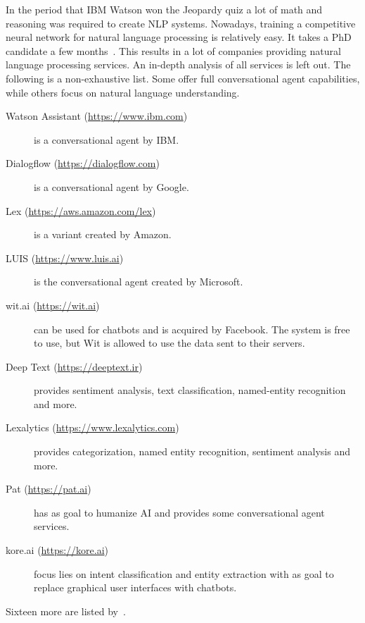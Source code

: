 In the period that IBM Watson won the Jeopardy quiz a lot of math and reasoning was required to create NLP systems.
Nowadays, training a competitive neural network for natural language processing is relatively easy.
It takes a PhD candidate a few months~\citep{manning2017lectures}.
This results in a lot of companies providing natural language processing services.
An in-depth analysis of all services is left out.
The following is a non-exhaustive list.
Some offer full conversational agent capabilities, while others focus on natural language understanding.
\begin{description}
    \item [Watson Assistant (\url{https://www.ibm.com})] is a conversational agent by IBM.
    \item [Dialogflow (\url{https://dialogflow.com})] is a conversational agent by Google.
    \item [Lex (\url{https://aws.amazon.com/lex})] is a variant created by Amazon.
    \item [LUIS (\url{https://www.luis.ai})] is the conversational agent created by Microsoft.
    \item [wit.ai (\url{https://wit.ai})] can be used for chatbots and is acquired by Facebook.
    The system is free to use, but Wit is allowed to use the data sent to their servers.
    \item [Deep Text (\url{https://deeptext.ir})] provides sentiment analysis, text classification, named-entity recognition and more.
    \item [Lexalytics (\url{https://www.lexalytics.com})] provides categorization, named entity recognition, sentiment analysis and more.
    \item [Pat (\url{https://pat.ai})] has as goal to humanize AI and provides some conversational agent services.
    \item [kore.ai (\url{https://kore.ai})] focus lies on intent classification and entity extraction with as goal to replace graphical user interfaces with chatbots.
\end{description}
Sixteen more are listed by~\citet{dale2018text}.
